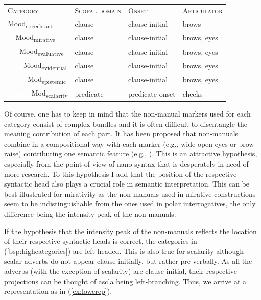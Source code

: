 \begin{exe}
\ex\label{bsp:highcategories} 
\begin{adjustbox}{max width=0.9\textwidth}
\begin{tabular}[t]{p{3.2cm}p{2.8cm}p{2.6cm}p{2.5cm}} %
\textsc{Category} & \textsc{Scopal domain} & \textsc{Onset} & \textsc{Articulator}  \\
Mood\textsubscript{speech act} & clause & clause-initial & brows \\
\textcolor{white}{nn}Mood\textsubscript{mirative} & clause & clause-initial & brows, eyes\\
\textcolor{white}{nnn}Mood\textsubscript{evaluative} & clause & clause-initial & brows, eyes \\
\textcolor{white}{nnnn}Mood\textsubscript{evidential} & clause & clause-initial & brows, eyes \\
\textcolor{white}{nnnnn}Mod\textsubscript{epistemic} & clause & clause-initial & brows, eyes \\
\textcolor{white}{nnnnnn}Mod\textsubscript{scalarity} & predicate & predicate onset & cheeks \\
\end{tabular}
\end{adjustbox}
\end{exe}

\noindent Of course, one has to keep in mind that the non-manual markers used for each category consist of complex bundles and it is often difficult to disentangle the meaning contribution of each part. It has been proposed that non-manuals combine in a compositional way with each marker (e.g., wide-open eyes or brow-raise) contributing one semantic feature (e.g., \citealt{herrmann2013modal}). This is an attractive hypothesis, especially from the point of view of nano-syntax that is desperately in need of more research. To this hypothesis I add that the position of the respective syntactic head also plays a crucial role in semantic interpretation. This can be best illustrated for mirativity as the non-manuals used in mirative constructions seem to be indistinguishable from the ones used in polar interrogatives, the only difference being the intensity peak of the non-manuals. 

If the hypothesis that the intensity peak of the non-manuals reflects the location of their respective syntactic heads is correct, the categories in (\ref{bsp:highcategories}) are left-headed. This is also true for scalarity although scalar adverbs do not appear clause-initially, but rather pre-verbally. As all the adverbs (with the exception of scalarity) are clause-initial, their respective projections can be thought of ascla being left-branching. Thus, we arrive at a representation as in (\ref{ex:lowercp}). 




